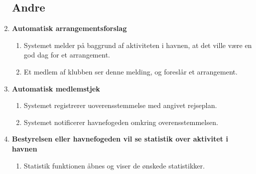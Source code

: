 \begin{enumerate}
\subsection{Andre}

    \item{\bf{Automatisk arrangementsforslag}}
      \begin{enumerate}
        \item Systemet melder på baggrund af aktiviteten i havnen, at det ville være en god dag for et arrangement.
        \item Et medlem af klubben ser denne melding, og foreslår et arrangement.
      \end{enumerate}

    \item{\bf{Automatisk medlemstjek}}
      \begin{enumerate}
        \item Systemet registrerer uoverensstemmelse med angivet rejseplan.
        \item Systemet notificerer havnefogeden omkring overensstemmelsen.
      \end{enumerate}

    \item{\bf{Bestyrelsen eller havnefogeden vil se statistik over aktivitet i havnen}}
      \begin{enumerate}
        \item Statistik funktionen åbnes og viser de ønskede statistikker.
      \end{enumerate}

  \end{enumerate}
